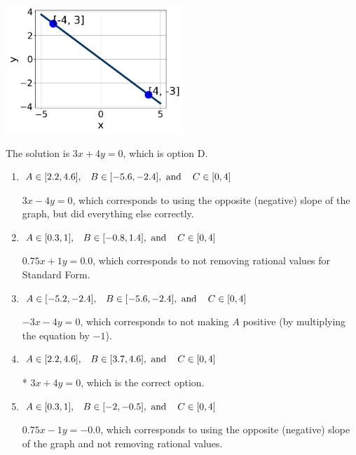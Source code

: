 \documentclass{extbook}[14pt]
\begin{document}
\begin{enumerate}
{\begin{center}
    \includegraphics[width=0.5\textwidth]{../Figures/linearGraphToStandardA.png}
\end{center}


The solution is \( 3x + 4y = 0 \), which is option D.\begin{enumerate}[label=\Alph*.]
\item \( A \in [2.2, 4.6], \hspace{3mm} B \in [-5.6, -2.4], \text{ and } \hspace{3mm} C \in [0, 4] \)

 $3x - 4y = 0$, which corresponds to using the opposite (negative) slope of the graph, but did everything else correctly.
\item \( A \in [0.3, 1], \hspace{3mm} B \in [-0.8, 1.4], \text{ and } \hspace{3mm} C \in [0, 4] \)

 $0.75x + 1y = 0.0$, which corresponds to not removing rational values for Standard Form.
\item \( A \in [-5.2, -2.4], \hspace{3mm} B \in [-5.6, -2.4], \text{ and } \hspace{3mm} C \in [0, 4] \)

 $-3x - 4y = 0$, which corresponds to not making $A$ positive (by multiplying the equation by $-1$).
\item \( A \in [2.2, 4.6], \hspace{3mm} B \in [3.7, 4.6], \text{ and } \hspace{3mm} C \in [0, 4] \)

* $3x + 4y = 0$, which is the correct option.
\item \( A \in [0.3, 1], \hspace{3mm} B \in [-2, -0.5], \text{ and } \hspace{3mm} C \in [0, 4] \)

 $0.75x - 1y = -0.0$, which corresponds to using the opposite (negative) slope of the graph and not removing rational values.
\end{enumerate}

}
\end{enumerate}
\end{document}
